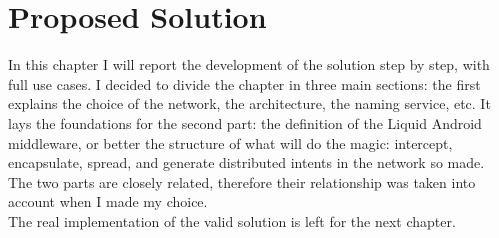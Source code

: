 %
%
\chapter{Proposed Solution}
%
\label{cap:proposedsolution}
%
%
\par In this chapter I will report the development of the solution step by step, with full use cases. %
 I decided to divide the chapter in three main sections: the first explains the choice of the network, the architecture, the naming service, etc. It lays the foundations for the second part: the definition of the Liquid Android middleware, or better the structure of what will do the magic: intercept, encapsulate, spread, and generate distributed intents in the network so made. The two parts are closely related, therefore their relationship was taken into account when I made my choice.\\
The real implementation of the valid solution is left for the next chapter.
%

